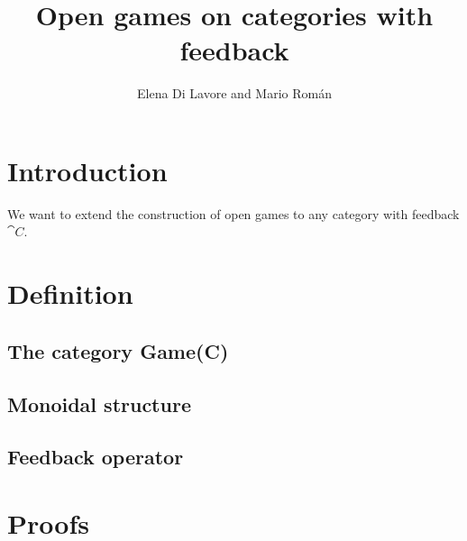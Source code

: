 \documentclass{article}
\title{Open games on categories with feedback}
\author{Elena Di Lavore and Mario Rom\'an}
\begin{document}
\maketitle
\section{Introduction}
We want to extend the construction of open games to any category with feedback \(\cat{C}\).
\section{Definition}
\subsection{The category Game(C)}

\subsection{Monoidal structure}

\subsection{Feedback operator}

\appendix
\section{Proofs}


%
\end{document}
